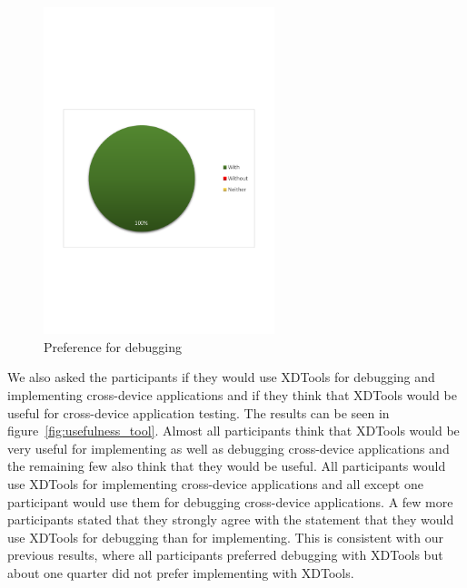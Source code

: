 \begin{figure}[H]
  \centering
    \includegraphics[width=0.6\textwidth]{images/charts/prefer_debugging.pdf}
	\caption[Preference for debugging]{Preference for debugging}
	\label{fig:prefer_debugging}
\end{figure}


We also asked the participants if they would use XDTools for debugging and implementing cross-device applications and if they think that XDTools would be useful for cross-device application testing. The results can be seen in figure~\ref{fig:usefulness_tool}. Almost all participants think that XDTools would be very useful for implementing as well as debugging cross-device applications and the remaining few also think that they would be useful. All participants would use XDTools for implementing cross-device applications and all except one participant would use them for debugging cross-device applications. A few more participants stated that they strongly agree with the statement that they would use XDTools for debugging than for implementing. This is consistent with our previous results, where all participants preferred debugging with XDTools but about one quarter did not prefer implementing with XDTools.

